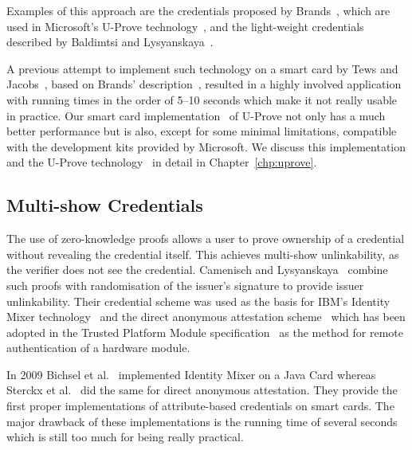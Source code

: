 Examples of this approach are the credentials proposed by
Brands~\cite{Brands2000}, which are used in Microsoft's U-Prove
technology~\cite{U-Prove_Crypto2013}, and the light-weight credentials described
by Baldimtsi and Lysyanskaya~\cite{BaLy2012}.

A previous attempt to implement such technology on a smart card by Tews and
Jacobs~\cite{TewsJacobs09}, based on Brands' description~\cite{Brands2000},
resulted in a highly involved application with running times in the order of
5--10 seconds which make it not really usable in practice. Our smart card
implementation~\cite{MostowskiVullers11} of U-Prove not only has a much better
performance but is also, except for some minimal limitations, compatible with
the development kits provided by Microsoft. We discuss this implementation and
the U-Prove technology~\cite{U-Prove_Crypto2013} in detail in
Chapter~\ref{chp:uprove}.

\subsection{Multi-show Credentials}

The use of zero-knowledge proofs allows a user to
prove ownership of a credential without revealing the credential itself. This
achieves multi-show unlinkability, as the verifier does not see the credential.
Camenisch and Lysyanskaya~\cite{CamenischLysyanskaya2001,CamenischLysyanskaya2003}
combine such proofs with randomisation of the issuer's signature to provide issuer unlinkability.
Their credential scheme was used as the basis for IBM's Identity Mixer
 technology~\cite{IdemixCrypto2012} and the direct
anonymous attestation
scheme~\cite{BrickellCC04} which has been adopted in the Trusted Platform Module
specification~\cite{TPM_1.2} as the method for remote authentication
 of a hardware module.

In 2009 Bichsel et al.~\cite{BichselCGS2009} implemented Identity Mixer
 on a Java Card whereas Sterckx et
al.~\cite{Sterckx09} did the same for direct anonymous attestation. They provide the first proper implementations of
attribute-based credentials on smart cards. The major drawback of these
implementations is the running time of several seconds which is still too much
for being really practical.

